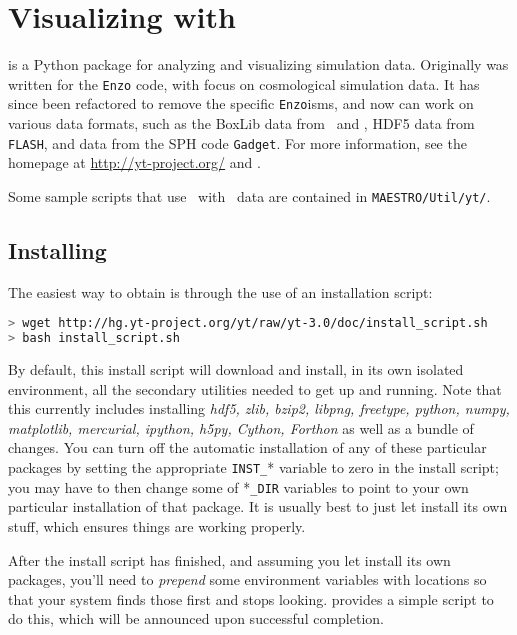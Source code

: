 \section{\label{sec:vis:yt} Visualizing with \yt}

\yt is a Python package for analyzing and visualizing simulation data.
Originally \yt was written for the {\tt Enzo} code, with focus on
cosmological simulation data.  It has since been refactored to remove
the specific {\tt Enzo}isms, and now can work on various data formats,
such as the BoxLib data from \maestro\ and \castro, HDF5 data
from {\tt FLASH}, and data from the SPH code {\tt Gadget}.  For more
information, see the \yt homepage at \url{http://yt-project.org/} and
\cite{yt}.


Some sample scripts that use \yt\ with \maestro\ data are contained in 
{\tt MAESTRO/Util/yt/}.

\subsection{Installing \yt}
The easiest way to obtain \yt is through the use of an installation script:
\begin{lstlisting}[language=bash,mathescape=false]
> wget http://hg.yt-project.org/yt/raw/yt-3.0/doc/install_script.sh
> bash install_script.sh
\end{lstlisting}
By default, this \yt install script will download and install, in its
own isolated environment, all the secondary utilities needed to get
\yt up and running.  Note that this currently includes installing {\it
  hdf5, zlib, bzip2, libpng, freetype, python, numpy, matplotlib,
  mercurial, ipython, h5py, Cython, Forthon} as well as a  bundle of changes.  You can turn off the automatic
installation of any of these particular packages by setting the
appropriate {\tt INST\_}* variable to zero in the install script; you
may have to then change some of *{\tt \_DIR} variables to point to
your own particular installation of that package.  It is usually best
to just let \yt install its own stuff, which ensures things are
working properly.

After the install script has finished, and assuming you let \yt
install its own packages, you'll need to {\it prepend} some
environment variables with \yt locations so that your system finds
those first and stops looking.  \yt provides a simple script to
do this, which will be announced upon successful completion.

